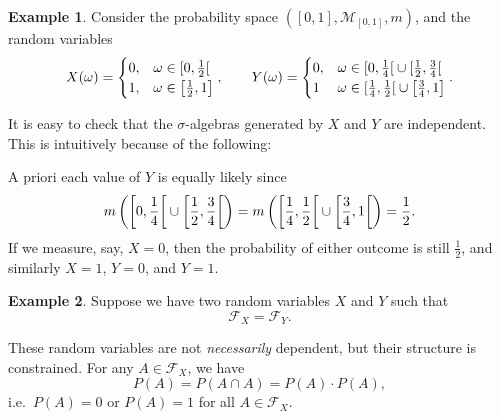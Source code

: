 \documentclass[a4paper,12pt]{scrreprt}
\theoremstyle{definition}
\newtheorem{example}{Example}[section]
\theoremstyle{plain}
\theoremstyle{remark}
\begin{document}
\begin{example}
  \label{eg:independentstepfunctions}
  Consider the probability space $\left( [0, 1], \mathcal{M}_{[0, 1]}, m \right)$, and the random variables
  \begin{equation*}
    X(\omega) =
    \begin{cases}
      0, &\omega \in \interval[open right]{0}{\frac{1}{2}} \\
      1, &\omega \in \left[ \frac{1}{2}, 1 \right]
    \end{cases},
    \qquad
    Y(\omega) =
    \begin{cases}
      0, & \omega \in \interval[open right]{0}{\frac{1}{4}} \cup \interval[open right]{\frac{1}{2}}{\frac{3}{4}} \\
      1 & \omega \in \interval[open right]{\frac{1}{4}}{\frac{1}{2}} \cup \left[ \frac{3}{4}, 1 \right]
    \end{cases}.
  \end{equation*}

  It is easy to check that the $\sigma$-algebras generated by $X$ and $Y$ are independent. This is intuitively because of the following:

  A priori each value of $Y$ is equally likely since
  \begin{equation*}
    m\left( \interval[open right, scaled]{0}{\frac{1}{4}} \cup \interval[open right, scaled]{\frac{1}{2}}{\frac{3}{4}} \right) = m\left( \interval[open right, scaled]{\frac{1}{4}}{\frac{1}{2}} \cup \interval[open right, scaled]{\frac{3}{4}}{1} \right) = \frac{1}{2}.
  \end{equation*}
  If we measure, say, $X = 0$, then the probability of either outcome is still $\frac{1}{2}$, and similarly $X = 1$, $Y = 0$, and $Y = 1$.
\end{example}

\begin{example}
  Suppose we have two random variables $X$ and $Y$ such that
  \begin{equation*}
    \mathcal{F}_{X} = \mathcal{F}_{Y}.
  \end{equation*}

  These random variables are not \emph{necessarily} dependent, but their structure is constrained. For any $A \in \mathcal{F}_{X}$, we have
  \begin{equation*}
    P(A) = P(A \cap A) = P(A)\cdot P(A),
  \end{equation*}
  i.e.\ $P(A) = 0$ or $P(A) = 1$ for all $A \in \mathcal{F}_{X}$.
\end{example}
\end{document}
